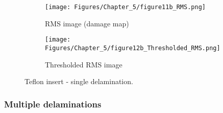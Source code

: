 \begin{figure} [!h]
	\begin{subfigure}[b]{.5\textwidth}
		\centering
		\texttt{[image: Figures/Chapter\_5/figure11b\_RMS.png]}
		\caption{RMS image (damage map)}
		\label{fig:RMS_CFRP_Teflon_3o_saeed}
	\end{subfigure}
	\hfill
	\begin{subfigure}[b]{.42\textwidth}
		\centering
		\texttt{[image: Figures/Chapter\_5/figure12b\_Thresholded\_RMS.png]}
		\caption{Thresholded RMS image} 
		\label{fig:RMS_CFRP_Teflon_3o_ijjeh}
	\end{subfigure}
	\caption{Teflon insert - single delamination.}
	\label{fig:RMS_CFRP_Teflon_3o_images}
\end{figure} 
\clearpage
\subsubsection{Multiple delaminations}
\label{sec5322}


